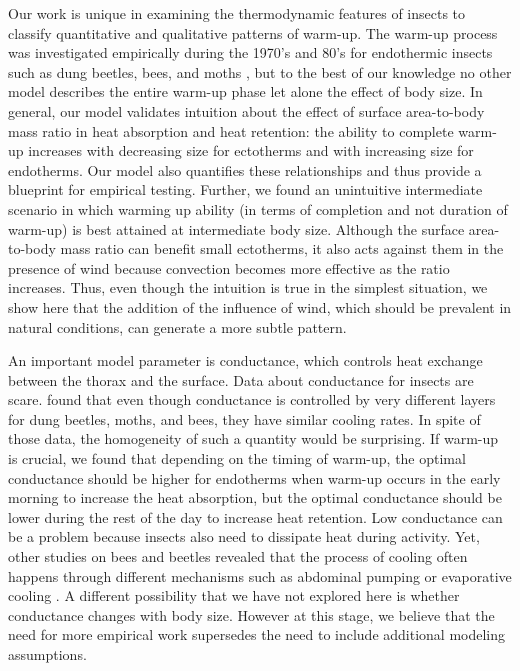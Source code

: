 Our work is unique in examining the thermodynamic features of insects to classify quantitative and qualitative patterns of warm-up.
The warm-up process was investigated empirically during the 1970's and 80's for endothermic insects  such as dung beetles, bees, and moths \citep{Heinrich1975, Bartholomew1978, Bartholomew1981}, but to the best of our knowledge no other model describes the entire warm-up phase let alone the effect of body size.
In general, our model validates intuition about the effect of surface area-to-body mass ratio in heat absorption and heat retention: the ability to complete warm-up increases with decreasing size for ectotherms and with increasing size for endotherms.
Our model also quantifies these relationships and thus provide a blueprint for empirical testing.
Further, we found an unintuitive intermediate scenario in which warming up ability (in terms of completion and not duration of warm-up) is best attained at intermediate body size.
Although the surface area-to-body mass ratio can benefit small ectotherms, it also acts against them in the presence of wind because convection becomes more effective as the ratio increases.
Thus, even though the intuition is true in the simplest situation, we show here that the addition of the influence of wind, which should be prevalent in natural conditions, can generate a more subtle pattern.

An important model parameter is conductance, which controls heat exchange between the thorax and the surface.
Data about conductance for insects are scare.
\citet{Bartholomew1978} found that even though conductance is controlled by very different layers for dung beetles, moths, and bees, they have similar cooling rates. %
In spite of those data, the homogeneity of such a quantity would be surprising. %
If warm-up is crucial, we found that depending on the timing of warm-up, the optimal conductance should be higher for endotherms when warm-up occurs in the early morning  to increase the heat absorption, but the optimal conductance should be lower during the rest of the day to increase heat retention.
Low conductance  can be a problem because insects also need to dissipate heat during activity.
Yet, other studies on bees and beetles revealed that the process of cooling often happens through different mechanisms such as abdominal pumping or evaporative cooling \citep{Heinrich1979, Verdu2012}.
A different possibility that we have not explored here is whether conductance changes with body size.
However at this stage, we believe that the need for more empirical work supersedes the need to include additional modeling assumptions. %


